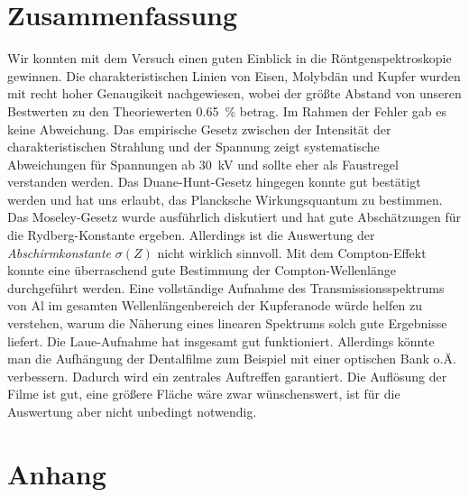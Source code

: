 \documentclass[paper=a4,
	fontsize=10pt,
	DIV=18,
	twocolumn,
	parskip=half
	]{scrartcl}
\numberwithin{equation}{section}    %
\begin{document}


%
\section{Zusammenfassung}
%
Wir konnten mit dem Versuch einen guten Einblick in die Röntgenspektroskopie
gewinnen. Die charakteristischen Linien von Eisen, Molybdän und Kupfer wurden mit
recht hoher Genaugikeit nachgewiesen, wobei der größte Abstand von unseren
Bestwerten zu den Theoriewerten 
\SI{0.65}{\percent} betrag. Im Rahmen der Fehler gab es keine Abweichung. 
 Das empirische Gesetz zwischen der Intensität der
charakteristischen Strahlung und der Spannung zeigt systematische Abweichungen
für Spannungen ab \SI{30}{\kilo\volt} und sollte eher als Faustregel verstanden
werden. Das Duane-Hunt-Gesetz hingegen konnte gut bestätigt werden und hat uns
erlaubt, das Plancksche Wirkungsquantum zu bestimmen. Das Moseley-Gesetz wurde
ausführlich diskutiert und hat gute Abschätzungen für die Rydberg-Konstante
ergeben. Allerdings ist die Auswertung der \emph{Abschirmkonstante} $\sigma(Z)$
nicht wirklich sinnvoll. Mit dem Compton-Effekt konnte eine überraschend gute
Bestimmung der Compton-Wellenlänge durchgeführt werden. Eine vollständige
Aufnahme des Transmissionsspektrums von Al im gesamten Wellenlängenbereich der
Kupferanode würde helfen zu verstehen, warum die Näherung eines linearen
Spektrums solch gute Ergebnisse liefert. Die Laue-Aufnahme hat insgesamt gut
funktioniert. Allerdings könnte man die Aufhängung der Dentalfilme zum Beispiel
mit einer optischen Bank o.Ä. verbessern. Dadurch wird ein zentrales 
Auftreffen garantiert. Die Auflösung 
der Filme ist gut, eine größere Fläche wäre zwar wünschenswert, ist für die
Auswertung aber nicht unbedingt notwendig. 
%
%
%
%

\small

\nocite{*}

\normalsize


\onecolumn
\pagestyle{empty}
% 

\section{Anhang}
\label{Anhang}
\end{document}
